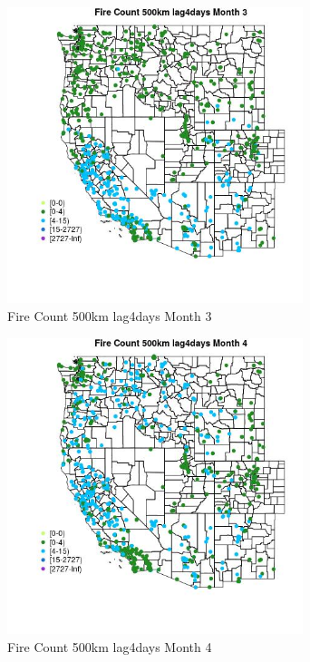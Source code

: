 \begin{figure} 
\centering  
\includegraphics[width=0.77\textwidth]{Code_Outputs/Report_ML_input_PM25_Step4_part_f_de_duplicated_aves_prioritize_24hr_obswNAs_MapObsMo3Fire_Count_500km_lag4days.jpg} 
\caption{\label{fig:Report_ML_input_PM25_Step4_part_f_de_duplicated_aves_prioritize_24hr_obswNAsMapObsMo3Fire_Count_500km_lag4days}Fire Count 500km lag4days Month 3} 
\end{figure} 
 

\begin{figure} 
\centering  
\includegraphics[width=0.77\textwidth]{Code_Outputs/Report_ML_input_PM25_Step4_part_f_de_duplicated_aves_prioritize_24hr_obswNAs_MapObsMo4Fire_Count_500km_lag4days.jpg} 
\caption{\label{fig:Report_ML_input_PM25_Step4_part_f_de_duplicated_aves_prioritize_24hr_obswNAsMapObsMo4Fire_Count_500km_lag4days}Fire Count 500km lag4days Month 4} 
\end{figure} 
 

